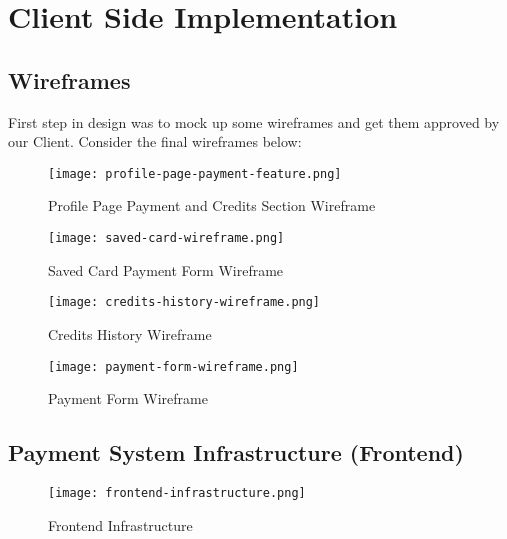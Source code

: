 \section{Client Side Implementation}
\label{sec:client-side-implementation}

\subsection{Wireframes}
\label{subsec:wireframes}

First step in design was to mock up some wireframes and get them approved by our Client. Consider the final wireframes below:\\

\begin{figure}[!hbt]
  \centering
 	\texttt{[image: profile-page-payment-feature.png]}
  \caption{Profile Page Payment and Credits Section Wireframe}
 	\label{fig:profile-wireframe}
\end{figure}

\begin{figure}[!hbt]
  \centering
 	\texttt{[image: saved-card-wireframe.png]}
  \caption{Saved Card Payment Form Wireframe}
 	\label{fig:saved-card-wireframe}
\end{figure}

\begin{figure}[!hbt]
  \centering
 	\texttt{[image: credits-history-wireframe.png]}
  \caption{Credits History Wireframe}
 	\label{fig:credits-history-wireframe}
\end{figure}

\begin{figure}[!hbt]
  \centering
 	\texttt{[image: payment-form-wireframe.png]}
  \caption{Payment Form Wireframe}
 	\label{fig:payment-form-wireframe}
\end{figure}

\subsection{Payment System Infrastructure (Frontend)}
\label{subsec:payment-system-infrastructure}

\begin{figure}[!hbt]
  \centering
 	\texttt{[image: frontend-infrastructure.png]}
  \caption{Frontend Infrastructure}
 	\label{fig:frontend-infrastructure-diagram}
\end{figure}

